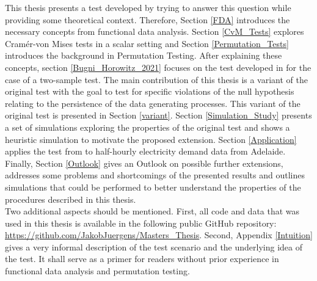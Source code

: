 \documentclass[12pt, a4paper]{article}
\theoremstyle{MAstyle} \newtheorem{assumption}{Assumption}[section]
\theoremstyle{MAstyle} \newtheorem{definition}{Definition}[section]
\theoremstyle{MAstyle} \newtheorem{theorem}{Theorem}[section]
\begin{document}
		This thesis presents a test developed by \cite{bugni_permutation_2021} trying to answer this question while providing some theoretical context. Therefore, Section \ref{FDA} introduces the necessary concepts from functional data analysis. 
		Section \ref{CvM_Tests} explores Cram\'{e}r-von Mises tests in a scalar setting and Section \ref{Permutation_Tests} introduces the background in Permutation Testing.
		After explaining these concepts, section \ref{Bugni_Horowitz_2021} focuses on the test developed in \cite{bugni_permutation_2021} for the case of a two-sample test.
		The main contribution of this thesis is a variant of the original test with the goal to test for specific violations of the null hypothesis relating to the persistence of the data generating processes. This variant of the original test is presented in Section \ref{variant}.
		Section \ref{Simulation_Study} presents a set of simulations exploring the properties of the original test and shows a heuristic simulation to motivate the proposed extension. 
		Section \ref{Application} applies the test from \cite{bugni_permutation_2021} to half-hourly electricity demand data from Adelaide.
		Finally, Section \ref{Outlook} gives an Outlook on possible further extensions, addresses some problems and shortcomings of the presented results and outlines simulations that could be performed to better understand the properties of the procedures described in this thesis.\\
		
		Two additional aspects should be mentioned. First, all code and data that was used in this thesis is available in the following public GitHub repository: \url{https://github.com/JakobJuergens/Masters_Thesis}. 
		Second, Appendix \ref{Intuition} gives a very informal description of the test scenario and the underlying idea of the test. It shall serve as a primer for readers without prior experience in functional data analysis and permutation testing. 
	
\end{document}
